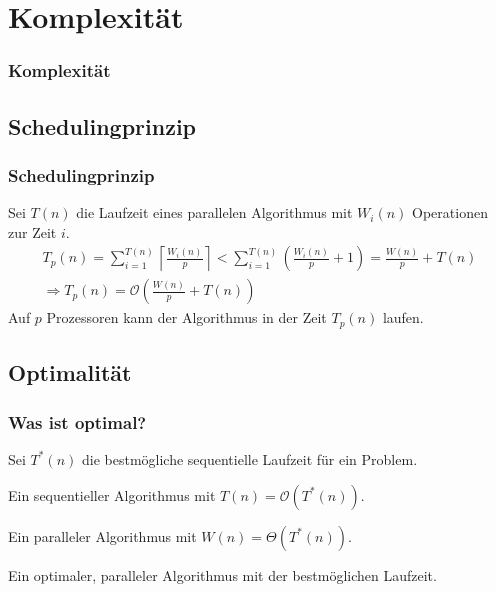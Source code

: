 \section{Komplexität}
\begin{frame}
    \frametitle{Komplexität}
    \tableofcontents[
        currentsection,
        hideothersubsections,
        sectionstyle=show/shaded,
    ]
\end{frame}

\subsection{Schedulingprinzip}
\begin{frame}
    \frametitle{Schedulingprinzip}
    Sei $T(n)$ die Laufzeit eines parallelen Algorithmus mit $W_i(n)$
    Operationen zur Zeit $i$.
    \begin{equation}
        \begin{gathered}
            T_p(n) = \sum_{i=1}^{T(n)} \left\lceil \frac{W_i(n)}{p} \right\rceil
            <
            \sum_{i=1}^{T(n)} \left( \frac{W_i(n)}{p} + 1 \right)
            = \frac{W(n)}{p} + T(n) \\
            \Rightarrow T_p(n) = \mathcal{O} \left( \frac{W(n)}{p} + T(n) \right)
        \end{gathered}
    \end{equation}
    Auf $p$ Prozessoren kann der Algorithmus in der Zeit $T_p(n)$ laufen.
\end{frame}

\subsection{Optimalität}
\begin{frame}
    \frametitle{Was ist optimal?}
    Sei $T^\ast(n)$ die bestmögliche sequentielle Laufzeit für ein Problem.
    \pause
    \begin{definition}
        Ein sequentieller Algorithmus mit $T(n) = \mathcal{O}(T^\ast(n))$.
    \end{definition}
    \pause
    \begin{definition}[optimal]
        Ein paralleler Algorithmus mit $W(n) = \Theta(T^\ast(n))$.
    \end{definition}
    \pause
    \begin{definition}
        Ein optimaler, paralleler Algorithmus mit der bestmöglichen Laufzeit.
    \end{definition}
\end{frame}

